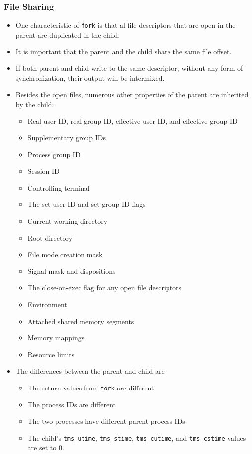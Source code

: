 \documentclass[]{article} \usepackage[all]{xy}
\newcommand{\code}{\texttt}
\begin{document}
\subsubsection*{File Sharing}
\begin{itemize}
\item One characteristic of \code{fork} is that al file descriptors that are
open in the parent are duplicated in the child.
\item It is important that the parent and the child share the same file offset.
\item If both parent and child write to the same descriptor, without any form of
synchronization, their output will be intermixed.
\item Besides the open files, numerous other properties of the parent are
inherited by the child:
\begin{itemize}
\item Real user ID, real group ID, effective user ID, and effective group ID
\item Supplementary group IDs
\item Process group ID
\item Session ID
\item Controlling terminal
\item The set-user-ID and set-group-ID flags
\item Current working directory
\item Root directory
\item File mode creation mask
\item Signal mask and dispositions
\item The close-on-exec flag for any open file descriptors
\item Environment
\item Attached shared memory segments
\item Memory mappings
\item Resource limits
\end{itemize}
\item The differences between the parent and child are
\begin{itemize}
\item The return values from \code{fork} are different
\item The process IDs are different
\item The two processes have different parent process IDs
\item The child's \code{tms\_utime}, \code{tms\_stime}, \code{tms\_cutime}, and
\code{tms\_cstime} values are set to 0.

\end{itemize}
\end{itemize}
\end{document}
